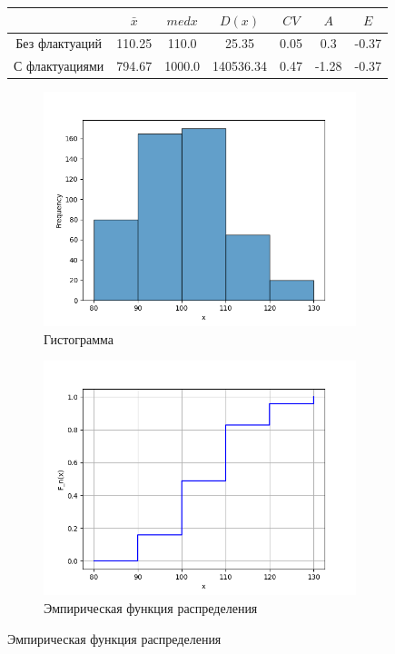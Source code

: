 \documentclass[12pt,a4paper]{article}
\begin{document}
\begin{figure}
		\begin{subtable}[htbp!]{0.8\textwidth}
			\centering
			\begin{tabular}{ |c|c|c|c|c|c|c| }
				\hline
				& \( \bar x \) & \( med x \) & \( D(x) \) & \( CV \) & \( A \) & \( E \) \\
				\hline
				Без флактуаций & 110.25 & 110.0 & 25.35 & 0.05 & 0.3 & -0.37 \\
				\hline
				С флактуациями & 794.67 & 1000.0 & 140536.34 & 0.47 & -1.28 & -0.37 \\
				\hline
			\end{tabular}
		\end{subtable}
	\end{figure}

	\begin{figure}
		\begin{subfigure}[htbp!]{0.8\textwidth}
			\begin{center}
				\includegraphics[width = 0.8\linewidth]{../graphics/5_hist.png}
				\caption{Гистограмма}
			\end{center}
		\end{subfigure}

		\begin{subfigure}[htbp!]{0.8\textwidth}
			\begin{center}
				\includegraphics[width = 0.8\linewidth]{../graphics/5_cdf.png}
				\caption{Эмпирическая функция распределения}
			\end{center}
		\end{subfigure}


\end{figure}
\end{document}
